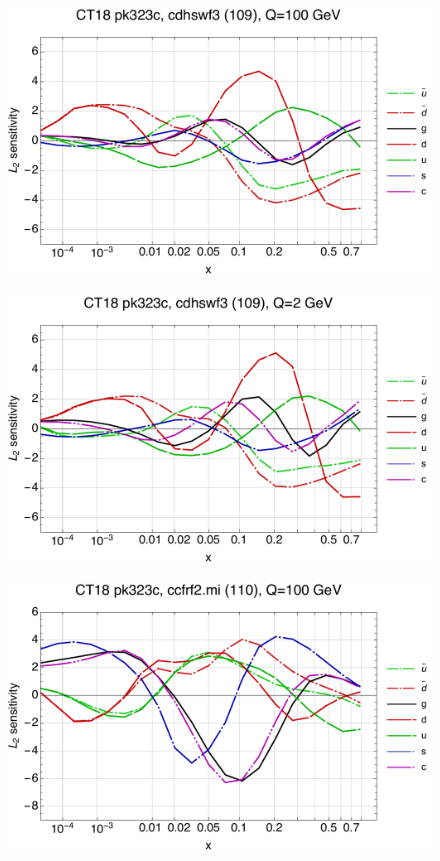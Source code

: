 \documentclass[10pt,aps,prd,floatfix,titlepage]{revtex4}
\begin{document}
\clearpage
\begin{figure}
\includegraphics[width=\textwidth,height=0.44\textheight,keepaspectratio]{1/109_ct18nn_L2_q100_Sf_1.pdf}
\caption{}
\end{figure}
\begin{figure}
\includegraphics[width=\textwidth,height=0.44\textheight,keepaspectratio]{1/109_ct18nn_L2_q2_Sf_1.pdf}
\caption{}
\end{figure}
\clearpage
\begin{figure}
\includegraphics[width=\textwidth,height=0.44\textheight,keepaspectratio]{1/110_ct18nn_L2_q100_Sf_1.pdf}
\caption{}
\end{figure}
\end{document}
